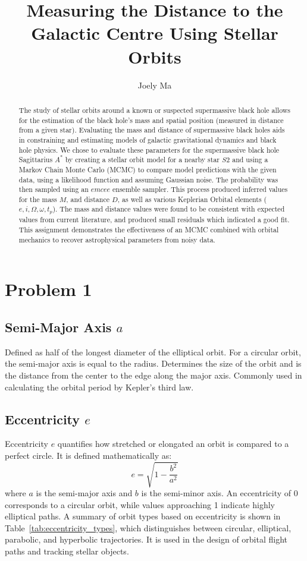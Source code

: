 \documentclass[linenumbers,trackchanges,astrosymb,]{aastex7}
\begin{document}
\title{Measuring the Distance to the Galactic Centre Using Stellar Orbits}

\author{Joely Ma}

\begin{abstract}

The study of stellar orbits around a known or suspected supermassive black hole allows for the estimation of the black hole's mass and spatial position (measured in distance from a given star). Evaluating the mass and distance of supermassive black holes aids in constraining and estimating models of galactic gravitational dynamics and black hole physics. We chose to evaluate these parameters for the supermassive black hole Sagittarius $A^*$ by creating a stellar orbit model for a nearby star $S2$ and using a Markov Chain Monte Carlo (MCMC) to compare model predictions with the given data, using a likelihood function and assuming Gaussian noise. The probability was then sampled using an $emcee$ ensemble sampler. This process produced inferred values for the mass $M$, and distance $D$, as well as various Keplerian Orbital elements ($e, i, \Omega, \omega, t_p$). The mass and distance values were found to be consistent with expected values from current literature, and produced small residuals which indicated a good fit. This assignment demonstrates the effectiveness of an MCMC combined with orbital mechanics to recover astrophysical parameters from noisy data. 

\end{abstract}

\section{Problem 1} 
\subsection{Semi-Major Axis $a$}

Defined as half of the longest diameter of the elliptical orbit. For a circular orbit, the semi-major axis is equal to the radius. Determines the size of the orbit and is the distance from the center to the edge along the major axis. Commonly used in calculating the orbital period by Kepler's third law. 

\subsection{Eccentricity $e$}
Eccentricity $e$ quantifies how stretched or elongated an orbit is compared to a perfect circle. It is defined mathematically as:
\[
e = \sqrt{1 - \frac{b^2}{a^2}}
\]
where $a$ is the semi-major axis and $b$ is the semi-minor axis. An eccentricity of 0 corresponds to a circular orbit, while values approaching 1 indicate highly elliptical paths. A summary of orbit types based on eccentricity is shown in Table~\ref{tab:eccentricity_types}, which distinguishes between circular, elliptical, parabolic, and hyperbolic trajectories. It is used in the design of orbital flight paths and tracking stellar objects. 
\end{document}
